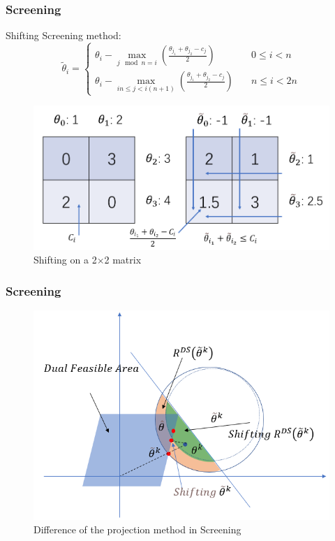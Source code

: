 \documentclass[dvipdfmx,cjk,t,10pt]{beamer}
\begin{document}
\begin{frame}
\frametitle{Screening}
Shifting Screening method:
		$$
		\tilde{\theta}_{i}=\left\{
	\begin{aligned}
			\theta_{i} - \max_{j \mod n =i}(\frac{\theta_{j_{1}}+\theta_{j_{2}}-c_j}{2}) &\quad 0\leq i<n\\
			\theta_{i} - \max_{in\leq j <i(n+1)}(\frac{\theta_{j_{1}}+\theta_{j_{2}}-c_j}{2}) & \quad n\leq i<2n
	\end{aligned}
	\right.
		$$
	\begin{figure}[htbp]
	\begin{center}	
	\includegraphics[width=0.8\hsize]{pic/shifting}
	\caption{Shifting on a 2$\times$2 matrix}
	\end{center}	
	\end{figure}

\end{frame}

\begin{frame}
\frametitle{Screening}
	\begin{figure}[htbp]
	\begin{center}	
	\includegraphics[width=0.8\hsize]{pic/new_proj}
	\caption{Difference of the projection method in Screening}
	\end{center}	
	\end{figure}

\end{frame}
\end{document}
